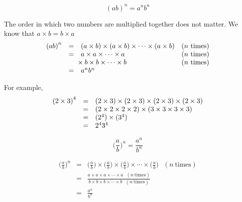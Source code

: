 

\Identity
{
 $$ {(ab)}^{n}={a}^{n}{b}^{n}$$

The order in which two numbers are multiplied together does not matter. We know that $a \times b = b \times a$ 
\begin{equation*}
\begin{array}{cclc}\hfill {(ab)}^{n}& =& (a \times b) \times (a \times b) \times \cdots \times (a \times b)\hfill & (\mbox{$n$ times})\hfill \\
	\hfill & =& a  \times a  \times \cdots  \times a\hfill & (\mbox{$n$ times})\hfill \\
	\hfill & & \phantom{\rule{-0.166667em}{0ex}}\phantom{\rule{-0.166667em}{0ex}}\phantom{\rule{-0.166667em}{0ex}}\phantom{\rule{-0.166667em}{0ex}}  \times b  \times b  \times \cdots  \times b\hfill & (\mbox{$n$ times})\hfill \\
	\hfill & =& {a}^{n}{b}^{n}\hfill & 
\end{array}
\end{equation*}
}

For example,
\begin{equation*}
  \begin{array}{ccl}\hfill {(2 \times 3)}^{4}& =& (2 \times 3)  \times (2 \times 3)  \times (2 \times 3)  \times (2 \times 3)\hfill \\
    & =& (2  \times 2  \times 2  \times 2)  \times (3  \times 3  \times 3  \times 3)\hfill \\
    & =& ({2}^{4})  \times ({3}^{4})\hfill \\
    & =& {2}^{4} {3}^{4}\hfill 
  \end{array}
\end{equation*}

\Identity
{
$$ \Big(\frac{a}{b}\Big)^n = \frac{a^n}{b^n} $$

\begin{eqnarray*}
 \Big(\frac{a}{b}\Big)^n & = & \Big(\frac{a}{b}\Big) \times \Big(\frac{a}{b}\Big) \times \Big(\frac{a}{b}\Big) \times \cdots \times \Big(\frac{a}{b}\Big) ~~~(n~\mbox{times}) \\
                         & = & \frac{a \times a \times a \times \cdots \times a ~~~(n~\mbox{times})}{b \times b \times b \times \cdots \times b ~~~(n~\mbox{times})}\\
                         & = & \frac{a^n}{b^n}
\end{eqnarray*}
}




